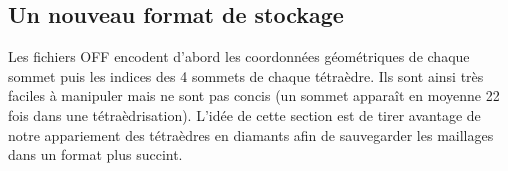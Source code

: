 
\subsection{Un nouveau format de stockage}
\noindent
Les fichiers OFF encodent d'abord les coordonnées géométriques de chaque sommet puis les indices des 4 sommets de chaque tétraèdre. Ils sont ainsi très faciles à manipuler mais ne sont pas concis (un sommet apparaît en moyenne 22 fois dans une tétraèdrisation). L'idée de cette section est de tirer avantage de notre appariement des tétraèdres en diamants afin de sauvegarder les maillages dans un format plus succint.
